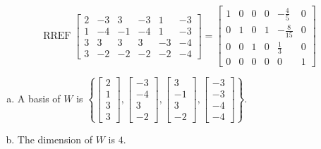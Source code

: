 \begin{exerciseAnswer} 


\[\operatorname{RREF} \left[\begin{array}{cccccc}
2 & -3 & 3 & -3 & 1 & -3 \\
1 & -4 & -1 & -4 & 1 & -3 \\
3 & 3 & 3 & 3 & -3 & -4 \\
3 & -2 & -2 & -2 & -2 & -4
\end{array}\right] = \left[\begin{array}{cccccc}
1 & 0 & 0 & 0 & -\frac{4}{5} & 0 \\
0 & 1 & 0 & 1 & -\frac{8}{15} & 0 \\
0 & 0 & 1 & 0 & \frac{1}{3} & 0 \\
0 & 0 & 0 & 0 & 0 & 1
\end{array}\right] \]


\begin{enumerate}[(a)]
\item A basis of \(W\) is \( \left\{ \left[\begin{array}{c}
2 \\
1 \\
3 \\
3
\end{array}\right] , \left[\begin{array}{c}
-3 \\
-4 \\
3 \\
-2
\end{array}\right] , \left[\begin{array}{c}
3 \\
-1 \\
3 \\
-2
\end{array}\right] , \left[\begin{array}{c}
-3 \\
-3 \\
-4 \\
-4
\end{array}\right] \right\} \).
\item The dimension of \(W\) is \( 4 \).
\end{enumerate}
    
\end{exerciseAnswer}
    
